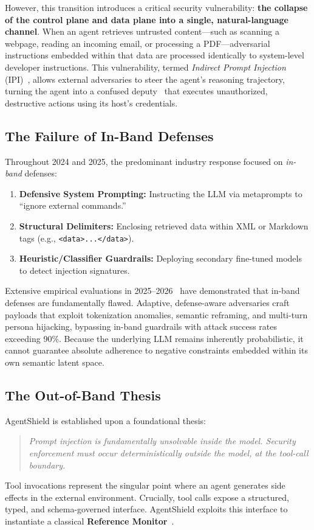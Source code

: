 \documentclass[conference]{IEEEtran}
\begin{document}
However, this transition introduces a critical security vulnerability: \textbf{the collapse of the control plane and data plane into a single, natural-language channel}. When an agent retrieves untrusted content---such as scanning a webpage, reading an incoming email, or processing a PDF---adversarial instructions embedded within that data are processed identically to system-level developer instructions. This vulnerability, termed \textit{Indirect Prompt Injection} (IPI)~\cite{greshake2023not}, allows external adversaries to steer the agent's reasoning trajectory, turning the agent into a confused deputy~\cite{hardy1988confused} that executes unauthorized, destructive actions using its host's credentials.

\subsection{The Failure of In-Band Defenses}
Throughout 2024 and 2025, the predominant industry response focused on \textit{in-band} defenses:
\begin{enumerate}
    \item \textbf{Defensive System Prompting:} Instructing the LLM via metaprompts to ``ignore external commands.''
    \item \textbf{Structural Delimiters:} Enclosing retrieved data within XML or Markdown tags (e.g., \texttt{<data>...</data>}).
    \item \textbf{Heuristic/Classifier Guardrails:} Deploying secondary fine-tuned models to detect injection signatures.
\end{enumerate}

Extensive empirical evaluations in 2025--2026~\cite{agentdojo,agentdyn,adaptive2026} have demonstrated that in-band defenses are fundamentally flawed. Adaptive, defense-aware adversaries craft payloads that exploit tokenization anomalies, semantic reframing, and multi-turn persona hijacking, bypassing in-band guardrails with attack success rates exceeding 90\%. Because the underlying LLM remains inherently probabilistic, it cannot guarantee absolute adherence to negative constraints embedded within its own semantic latent space.

\subsection{The Out-of-Band Thesis}
AgentShield is established upon a foundational thesis:
\begin{quote}
\textit{Prompt injection is fundamentally unsolvable inside the model. Security enforcement must occur deterministically outside the model, at the tool-call boundary.}
\end{quote}
Tool invocations represent the singular point where an agent generates side effects in the external environment. Crucially, tool calls expose a structured, typed, and schema-governed interface. AgentShield exploits this interface to instantiate a classical \textbf{Reference Monitor}~\cite{anderson1972computer}. 
\end{document}
